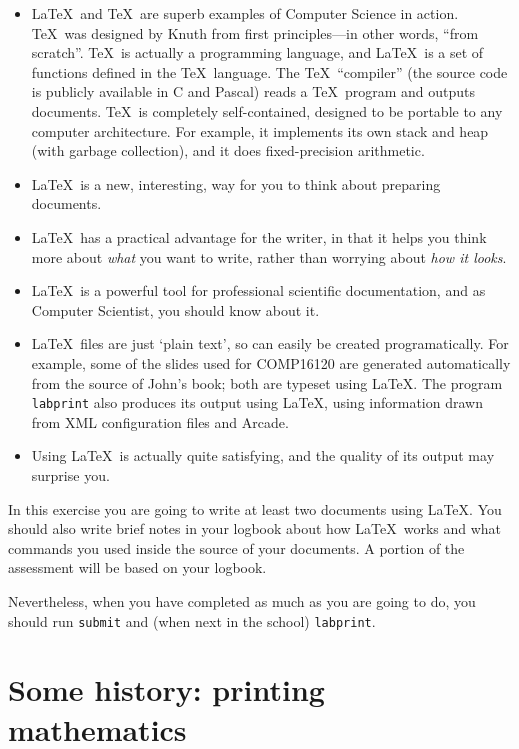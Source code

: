 \begin{refsection}
\begin{itemize}
\item \LaTeX\ and \TeX\ are superb examples of Computer Science in action. \TeX\ was designed by Knuth from first principles---in other words, ``from scratch''.  \TeX\ is actually a programming language, and \LaTeX\ is a set of functions defined in the \TeX\ language. The \TeX\ ``compiler''  (the source code is publicly available in C and Pascal)  reads a \TeX\ program and outputs documents. \TeX\ is completely self-contained, designed to be portable to any computer architecture. For example, it implements its own stack and heap (with garbage collection), and it does fixed-precision arithmetic. 
\item \LaTeX\ is a new, interesting, way for you to think about preparing documents. 
\item \LaTeX\ has a practical advantage for the writer, in that it helps you think more about \emph{what} you want to write, rather than worrying about \emph{how it looks}.
\item \LaTeX\ is a powerful tool for professional scientific documentation, and as Computer Scientist, you should know about it.
\item \LaTeX\ files are just `plain text', so can easily be created programatically. For example, some of the slides used for COMP16120 are generated automatically from the source of John's book; both are typeset using \LaTeX. The program \texttt{labprint} also produces its output using \LaTeX, using information drawn from XML configuration files and Arcade.
  
\item Using \LaTeX\ is actually quite satisfying, and the quality of its output may surprise you.
\end{itemize}

In this exercise you are going to write at least two documents using \LaTeX. You should also write brief notes in your logbook about how \LaTeX\ works and what commands you used inside the source of your documents. A portion of the assessment will be based on your logbook. 

Nevertheless, when you have completed as much as you are going to do, you should run \texttt{submit} and (when next in the school) \texttt{labprint}.

\section{Some history: printing mathematics}


\end{refsection}
